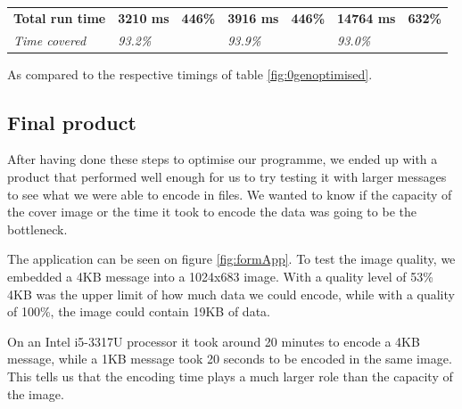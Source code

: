 \begin{table}[H]
\begin{tabular}{@{}lllllll@{}}
        \textbf{Total run time} & \textbf{3210 ms}                                                                          & \textbf{446\%}                                                                 & \textbf{3916 ms}                                                                           & \textbf{446\%}                                                                & \textbf{14764 ms}                                                                       & \textbf{632\%}                                                                \\
        \textit{Time covered}   & \textit{93.2\%}                                                                           & \textit{}                                                                      & \textit{93.9\%}                                                                            &                                                                               & \textit{93.0\%}                                                                         & \textit{}                                                                     \\ \bottomrule
    \end{tabular}
    \begin{tablenotes}
        \footnotesize{\item \textdagger As compared to the respective timings of table \ref{fig:0genoptimised}.}
    \end{tablenotes}
\end{table}

\subsection{Final product}
After having done these steps to optimise our programme, we ended up with a product that performed well enough for us to try testing it with larger messages to see what we were able to encode in files.
We wanted to know if the capacity of the cover image or the time it took to encode the data was going to be the bottleneck.

The application can be seen on figure \ref{fig:formApp}.
To test the image quality, we embedded a 4KB message into a 1024x683 image.
With a quality level of 53\% 4KB was the upper limit of how much data we could encode, while with a quality of 100\%, the image could contain 19KB of data.

On an Intel{\textregistered} i5-3317U processor it took around 20 minutes to encode a 4KB message, while a 1KB message took 20 seconds to be encoded in the same image.
This tells us that the encoding time plays a much larger role than the capacity of the image.

